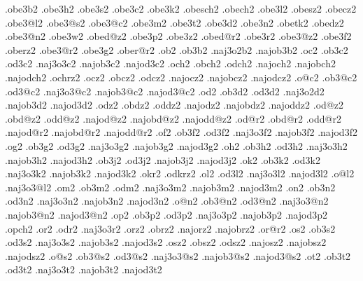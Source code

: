 {%
  .obe3b2                       .obe3h2                       .obe3s2    
  .obe3c2                       .obe3k2                       .obesch2   
  .obech2                       .obe3l2                       .obesz2    
  .obecz2                       .obe3@l2                      .obe3@s2   
  .obe3@c2                      .obe3m2                       .obe3t2    
  .obe3d2                       .obe3n2                       .obetk2
  .obedz2                       .obe3@n2                      .obe3w2
  .obed@z2                      .obe3p2                       .obe3z2
  .obed@r2                      .obe3r2                       .obe3@z2 
  .obe3f2                       .oberz2                       .obe3@r2 
  .obe3g2                       .ober@r2   
%
%
  .ob2    .ob3b2                 .naj3o2b2    .najob3b2    
  .oc2    .ob3c2    .od3c2       .naj3o3c2    .najob3c2    .najod3c2 
  .och2   .obch2    .odch2       .najoch2     .najobch2    .najodch2 
  .ochrz2 
  .ocz2   .obcz2    .odcz2       .najocz2     .najobcz2    .najodcz2
  .o@c2   .ob3@c2   .od3@c2      .naj3o3@c2   .najob3@c2   .najod3@c2
  .od2    .ob3d2    .od3d2       .naj3o2d2    .najob3d2    .najod3d2
  .odz2   .obdz2    .oddz2       .najodz2     .najobdz2    .najoddz2
  .od@z2  .obd@z2   .odd@z2      .najod@z2    .najobd@z2   .najodd@z2 
  .od@r2  .obd@r2   .odd@r2      .najod@r2    .najobd@r2   .najodd@r2
  .of2    .ob3f2    .od3f2       .naj3o3f2    .najob3f2    .najod3f2
  .og2    .ob3g2    .od3g2       .naj3o3g2    .najob3g2    .najod3g2 
  .oh2    .ob3h2    .od3h2       .naj3o3h2    .najob3h2    .najod3h2 
          .ob3j2    .od3j2                    .najob3j2    .najod3j2
  .ok2    .ob3k2    .od3k2       .naj3o3k2    .najob3k2    .najod3k2
  .okr2               
                    .odkrz2
  .ol2              .od3l2       .naj3o3l2                 .najod3l2
  .o@l2                          .naj3o3@l2   
  .om2    .ob3m2    .odm2        .naj3o3m2    .najob3m2    .najod3m2
  .on2    .ob3n2    .od3n2       .naj3o3n2    .najob3n2    .najod3n2
  .o@n2   .ob3@n2   .od3@n2      .naj3o3@n2   .najob3@n2   .najod3@n2
  .op2    .ob3p2    .od3p2       .naj3o3p2    .najob3p2    .najod3p2
  .opch2 
  .or2              .odr2        .naj3o3r2                 
  .orz2   .obrz2                 .najorz2     .najobrz2
  .or@r2 
  .os2    .ob3s2    .od3s2       .naj3o3s2    .najob3s2    .najod3s2
  .osz2   .obsz2    .odsz2       .najosz2     .najobsz2    .najodsz2 
  .o@s2   .ob3@s2   .od3@s2      .naj3o3@s2   .najob3@s2   .najod3@s2
  .ot2    .ob3t2    .od3t2       .naj3o3t2    .najob3t2    .najod3t2
}
